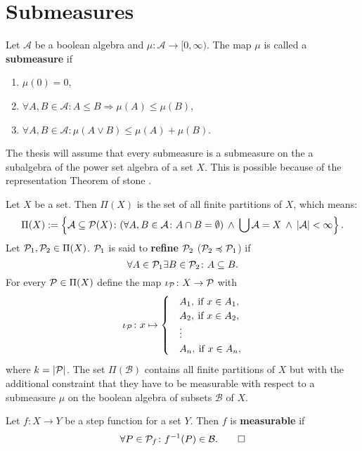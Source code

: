 \section{Submeasures}\label{appendixA}

\begin{defin}
  Let $\mathcal{A}$ be a boolean algebra and $\mu\colon \mathcal{A} \to [0, \infty)$. The map $\mu$ is called a \textbf{submeasure} if
  \begin{enumerate}[label=\roman*.)]
    \item $\mu(0) = 0$,
    \item $\forall A, B \in \mathcal{A}\colon A \leq B \Rightarrow \mu(A) \leq \mu(B)$,
    \item $\forall A, B \in \mathcal{A}\colon \mu(A \lor B) \leq \mu(A) + \mu(B)$.\qedhere
  \end{enumerate}
\end{defin}

The thesis will assume that every submeasure is a submeasure on the a subalgebra of the power set algebra of a set $X$. This is possible because of the representation Theorem of stone \cite{stone}.

\begin{defin}
  Let $X$ be a set. Then $\Pi(X)$ is the set of all finite partitions of $X$, which means:
  \begin{equation*}
    \Pi(X) := \left\{ \mathcal{A} \subseteq \P(X)\colon (\forall A,B \in \mathcal{A}\colon A \cap B = \emptyset) \: \land \: \bigcup\mathcal{A} = X \: \land \: \left| \mathcal{A} \right| < \infty \right\}.
  \end{equation*}
  Let $\P_1, \P_2 \in \Pi(X)$. $\P_1$ is said to \textbf{refine} $\P_2$ ($\P_2 \preccurlyeq \P_1$) if
  \begin{equation*}
    \forall A \in \P_1\exists B \in \P_2\colon A \subseteq B.
  \end{equation*}
  For every $\P \in \Pi(X)$ define the map $\iota_\P\colon X \to \P$ with
  \begin{equation*}
    \iota_\P\colon x \mapsto \begin{cases}
      &A_1, \: \text{if } x \in A_1, \\
      &A_2, \: \text{if } x \in A_2, \\
      &\vdots \\
      &A_n, \: \text{if } x \in A_n,
    \end{cases}
  \end{equation*}
  where $k = \left|\P\right|$.    
  The set $\Pi(\mathcal{B})$ contains all finite partitions of $X$ but with the additional constraint that they have to be measurable with respect to a submeasure $\mu$ on the boolean algebra of subsets $\mathcal{B}$ of $X$.

  Let $f\colon X \to Y$ be a step function for a set $Y$. Then $f$ is \textbf{measurable} if \[\forall P \in \P_f\colon f^{-1}(P) \in \mathcal{B}.\qedhere\]
\end{defin}

